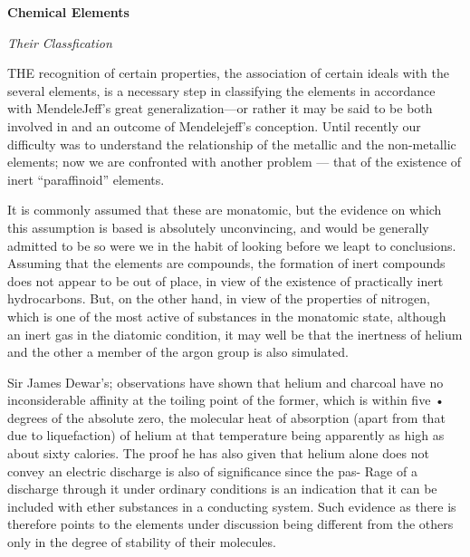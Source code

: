 \documentclass{article}
\begin{document}
\textbf{Chemical Elements}



\textit{Their Classfication}



THE recognition of certain properties, the association of certain ideals with the several elements, is a necessary step in classifying the elements in accordance with MendeleJeff's great generalization—or rather it may be said to be both involved in and an outcome of Mendelejeff's conception. Until recently our difficulty was to understand the relationship of the metallic and the non-metallic elements; now we are confronted with another problem — that of the existence of inert “paraffinoid” elements. 

It is commonly assumed that these are monatomic, but the evidence on which this assumption is based is absolutely unconvincing, and would be generally admitted to be so were we in the habit of looking before we leapt to conclusions. Assuming that the elements are compounds, the formation of inert compounds does not appear to be out of place, in view of the existence of practically inert hydrocarbons. But, on the other hand, in view of the properties of nitrogen, which is one of the most active of substances in the monatomic state, although an inert gas in the diatomic condition, it may well be that the inertness of helium and the other a member of the argon group is also simulated. 

Sir James Dewar's; observations have shown that helium and charcoal have no inconsiderable affinity at the toiling point of the former, which is within five • degrees of the absolute zero, the molecular heat of absorption (apart from that due to liquefaction) of helium at that temperature being apparently as high as about sixty calories. The proof he has also given that helium alone does not convey an electric discharge is also of significance since the pas- Rage of a discharge through it under ordinary conditions is an indication that it can be included with ether substances in a conducting system. Such evidence as there is therefore points to the elements under discussion being different from the others only in the degree of stability of their molecules. 
\end{document}
